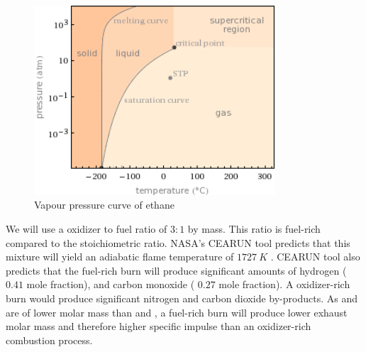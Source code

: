 \documentclass{article}
\begin{document}
\begin{figure}[h!]
\centering
\includegraphics[width = 0.8\textwidth]{c2h6_vap.png}
\caption{Vapour pressure curve of ethane} 
\label{c2h6_vap}
\end{figure}
We will use a oxidizer to fuel ratio of $3:1$ by mass. This ratio is fuel-rich compared to the stoichiometric ratio. NASA's CEARUN tool predicts that this mixture will yield an adiabatic flame temperature of $\SI{1727}{K}$ \cite{CEARUN}. CEARUN tool also predicts that the fuel-rich burn will produce significant amounts of hydrogen ($0.41$ mole fraction), and carbon monoxide ( $0.27$ mole fraction). A oxidizer-rich burn would produce significant nitrogen and carbon dioxide by-products. As  and  are of lower molar mass than  and , a fuel-rich burn will produce lower exhaust molar mass and therefore higher specific impulse than an oxidizer-rich combustion process.
\end{document}
